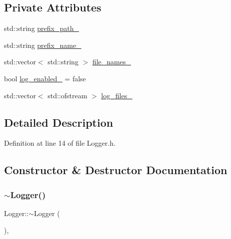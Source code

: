 \subsection*{Private Attributes}
\begin{DoxyCompactItemize}
\item 
std\+::string \mbox{\hyperlink{classbfl_1_1Logger_aa81c2aa16354c9a127957af1d38eb97f}{prefix\+\_\+path\+\_\+}}
\item 
std\+::string \mbox{\hyperlink{classbfl_1_1Logger_af93f5d2f3afc6874255701905981d776}{prefix\+\_\+name\+\_\+}}
\item 
std\+::vector$<$ std\+::string $>$ \mbox{\hyperlink{classbfl_1_1Logger_ac6cb274f1b9dc648d7762fee78358bcd}{file\+\_\+names\+\_\+}}
\item 
bool \mbox{\hyperlink{classbfl_1_1Logger_a1cd59822387b9c61b38699e011bfb277}{log\+\_\+enabled\+\_\+}} = false
\item 
std\+::vector$<$ std\+::ofstream $>$ \mbox{\hyperlink{classbfl_1_1Logger_a3cc2276bf1ad03941f1eca92c352b9c4}{log\+\_\+files\+\_\+}}
\end{DoxyCompactItemize}


\subsection{Detailed Description}


Definition at line 14 of file Logger.\+h.



\subsection{Constructor \& Destructor Documentation}
\mbox{\label{classbfl_1_1Logger_a843a878e056f9c2c835d9bddffb6692a}} 
\subsubsection{\texorpdfstring{$\sim$\+Logger()}{~Logger()}}
{\footnotesize\ttfamily Logger\+::$\sim$\+Logger (\begin{DoxyParamCaption}{ }\end{DoxyParamCaption})\hspace{0.3cm}{\ttfamily [virtual]}, {\ttfamily [noexcept]}}



